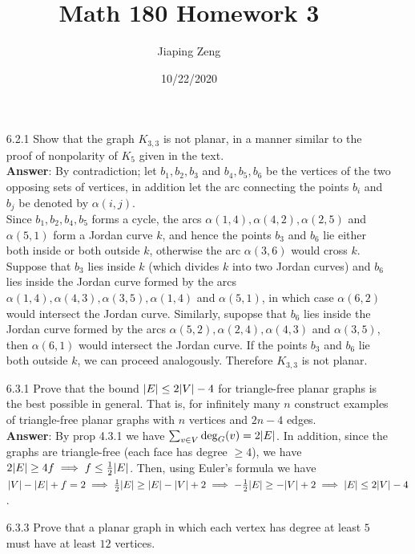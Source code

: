 \documentclass{article}
\title{Math 180 Homework 3}
\date{10/22/2020}
\author{Jiaping Zeng}
\begin{document}
\maketitle

\begin{itemize}
      \item [6.2.1] Show that the graph $K_{3,3}$ is not planar, in a manner similar to the proof of nonpolarity of $K_5$ given in the text.\\
            \textbf{Answer}: By contradiction; let $b_1,b_2,b_3$ and $b_4,b_5,b_6$ be the vertices of the two opposing sets of vertices, in addition let the arc connecting the points $b_i$ and $b_j$ be denoted by $\alpha(i,j)$.\\
            Since $b_1,b_2,b_4,b_5$ forms a cycle, the arcs $\alpha(1,4),\alpha(4,2),\alpha(2,5)$ and $\alpha(5,1)$ form a Jordan curve $k$, and hence the points $b_3$ and $b_6$ lie either both inside or both outside $k$, otherwise the arc $\alpha(3,6)$ would cross $k$.\\
            Suppose that $b_3$ lies inside $k$ (which divides $k$ into two Jordan curves) and $b_6$ lies inside the Jordan curve formed by the arcs $\alpha(1,4),\alpha(4,3),\alpha(3,5),\alpha(1,4)$ and $\alpha(5,1)$, in which case $\alpha(6,2)$ would intersect the Jordan curve. Similarly, supopse that $b_6$ lies inside the Jordan curve formed by the arcs $\alpha(5,2),\alpha(2,4),\alpha(4,3)$ and $\alpha(3,5)$, then $\alpha(6,1)$ would intersect the Jordan curve.
            If the points $b_3$ and $b_6$ lie both outside $k$, we can proceed analogously. Therefore $K_{3,3}$ is not planar.
      \item [6.3.1] Prove that the bound $\abs{E}\leq 2\abs{V}-4$ for triangle-free planar graphs is the best possible in general. That is, for infinitely many $n$ construct examples of triangle-free planar graphs with $n$ vertices and $2n-4$ edges.\\
            \textbf{Answer}: By prop 4.3.1 we have $\sum_{v\in V}\deg_G(v)=2\abs{E}$. In addition, since the graphs are triangle-free (each face has degree $\geq 4$), we have $2\abs{E}\geq 4f\implies f\leq\frac{1}{2}\abs{E}$. Then, using Euler's formula we have $\abs{V}-\abs{E}+f=2\implies\frac{1}{2}\abs{E}\geq\abs{E}-\abs{V}+2\implies -\frac{1}{2}\abs{E}\geq -\abs{V}+2\implies\abs{E}\leq 2\abs{V}-4$.
      \item [6.3.3] Prove that a planar graph in which each vertex has degree at least $5$ must have at least $12$ vertices.\\

\end{itemize}
\end{document}
